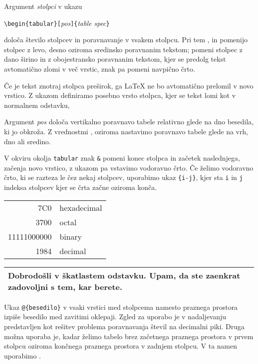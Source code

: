 Argument \emph{stolpci} v ukazu
\begin{lscommand}
\verb|\begin{tabular}[|\emph{pos}\verb|]{|\emph{table spec}\verb|}|
\end{lscommand} 
\noindent določa število stolpcev in poravnavanje v vsakem stolpcu. Pri tem ,  in   pomenijo 
stolpec z levo, desno oziroma sredinsko poravnanim tekstom;
 pomeni stolpec z dano širino in z obojestransko 
poravnanim tekstom, kjer se predolg tekst
avtomatično zlomi v več vrstic, znak \mfr{|} pa pomeni navpično črto.

Če je tekst znotraj stolpca preširok, ga \LaTeX{} ne bo avtomatično prelomil
v novo vrstico. Z ukazom  definiramo
posebno vrsto stolpca, kjer se tekst lomi kot v normalnem odstavku,
 
Argument \emph{pos} določa vertikalno poravnavo tabele 
relativno glede na dno besedila, ki jo obkroža. Z vrednostmi
,  oziroma  nastavimo poravnavo tabele
glede na vrh, dno ali sredino.

V okviru okolja \texttt{tabular} znak \verb|&| pomeni konec stolpca in začetek naslednjega,
\ci{\bs} začenja novo vrstico, z ukazom  pa vstavimo vodoravno črto.
Če želimo vodoravno črto, ki se razteza le čez nekaj stolpcev, uporabimo ukaz \verb|{i-j}|, kjer sta \verb|i| in 
\verb|j| indeksa stolpcev kjer se črta začne oziroma konča.

\begin{example}
\begin{tabular}{|r|l|}
\hline
7C0 & hexadecimal \\
3700 & octal \\ \cline{2-2}
11111000000 & binary \\
\hline \hline
1984 & decimal \\
\hline
\end{tabular}
\end{example}

\begin{example}
\begin{tabular}{|p{4.7cm}|}
\hline
Dobrodošli v škatlastem odstavku.
Upam, da ste zaenkrat zadovoljni
s tem, kar berete.\\
\hline 
\end{tabular}
\end{example}

Ukaz \verb|@{besedilo}|
v vsaki vrstici med stolpcema namesto praznega prostora izpiše besedilo med zavitimi oklepaji.  
Zgled za uporabo je v nadaljevanju predstavljen kot rešitev problema poravnavanja števil na decimalni piki.
Druga možna uporaba je, kadar želimo tabelo brez začetnega praznega prostora v prvem stolpcu oziroma 
končnega praznega prostora v zadnjem stolpcu. V ta namen uporabimo .

